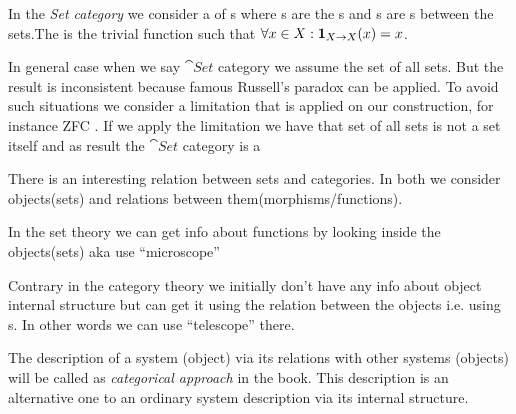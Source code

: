 \begin{definition}
  \label{def:setcategory}
  In the \textit{Set category} we consider a
   of 
  s where 
  s are the s and
  s are s between the
  sets.The  is the trivial function such that $\forall x \in
  X: \mathbf{1}_{ X \to X }(x) = x$.
\end{definition}

\begin{remark}
  In general case when we say $\cat{Set}$ category we assume the set
  of all sets. But the result is inconsistent because famous Russell's
  paradox \cite{wiki:russell_paradox} can be applied. To avoid such
  situations we consider a limitation that is applied on our
  construction, for instance 
  ZFC \cite{wiki:zfc}. If we apply the limitation we have that set of
  all sets is not a set itself and as result the  $\cat{Set}$
  category is a 
\end{remark}

\begin{remark}
  \label{rem:set_vs_category}
  There is an interesting relation between sets and categories. In both
  we consider objects(sets) and relations between
  them(morphisms/functions). 

  In the set theory we can get info about functions by looking inside
  the objects(sets) aka use ``microscope'' \cite{bib:milewski2018category} 

  Contrary in the category theory we initially don't have any info about object
  internal structure but can get it using the relation between the
  objects i.e. using s. In other words we can use
  ``telescope'' \cite{bib:milewski2018category}  there.
\end{remark}

\begin{definition}
\label{def:categorical_approach}
The description of a system (object) via its relations with other
systems (objects) will be called as  \textit{categorical approach} in
the book. This description is an alternative one to an ordinary system
description via its internal structure.
\end{definition}

